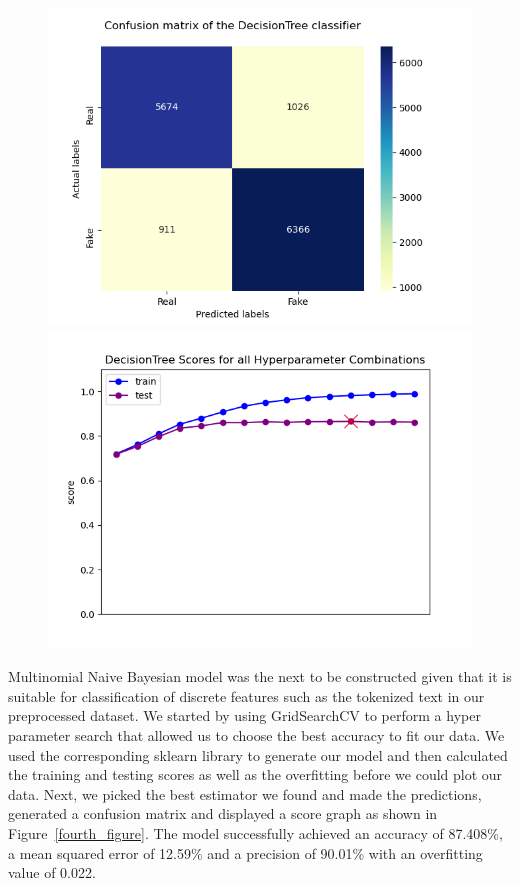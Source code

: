\documentclass[10pt,twocolumn,letterpaper]{article}
\begin{document}
\begin{figure}[h]
   \begin{center}
        \includegraphics[width=\linewidth]{Latex_Report/report/Graphs/DT/confusion_matrix.png}
        \includegraphics[width=\linewidth]{Latex_Report/report/Graphs/DT/scores_plot.png}
   \end{center}
        \vspace*{-8mm}
        \caption{\label{Third_figure}}
\end{figure}

Multinomial Naive Bayesian model was the next to be constructed given that it is suitable for classification of discrete features such as the tokenized text in our preprocessed dataset. We started by using GridSearchCV to perform a hyper parameter search that allowed us to choose the best accuracy to fit our data. We used the corresponding sklearn library to generate our model and then calculated the training and testing scores as well as the overfitting before we could plot our data. Next, we picked the best estimator we found and made the predictions, generated a confusion matrix and displayed a score graph as shown in Figure~\ref{fourth_figure}. The model successfully achieved an accuracy of 87.408\%, a mean squared error of 12.59\% and a precision of 90.01\% with an overfitting value of 0.022. 
\end{document}
